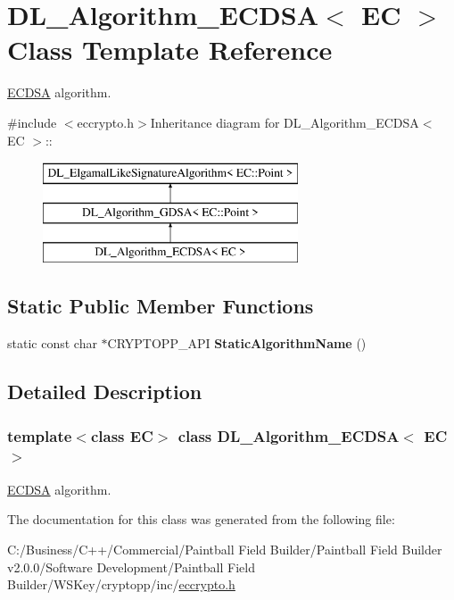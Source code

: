 \hypertarget{class_d_l___algorithm___e_c_d_s_a}{
\section{DL\_\-Algorithm\_\-ECDSA$<$ EC $>$ Class Template Reference}
\label{class_d_l___algorithm___e_c_d_s_a}
}


\hyperlink{struct_e_c_d_s_a}{ECDSA} algorithm.  


{\ttfamily \#include $<$eccrypto.h$>$}Inheritance diagram for DL\_\-Algorithm\_\-ECDSA$<$ EC $>$::\begin{figure}[H]
\begin{center}
\leavevmode
\includegraphics[height=3cm]{class_d_l___algorithm___e_c_d_s_a}
\end{center}
\end{figure}
\subsection*{Static Public Member Functions}
\begin{DoxyCompactItemize}
\item 
\hypertarget{class_d_l___algorithm___e_c_d_s_a_a678537b746327ca5469cafa978c96eb6}{
static const char $\ast$CRYPTOPP\_\-API {\bfseries StaticAlgorithmName} ()}
\label{class_d_l___algorithm___e_c_d_s_a_a678537b746327ca5469cafa978c96eb6}

\end{DoxyCompactItemize}


\subsection{Detailed Description}
\subsubsection*{template$<$class EC$>$ class DL\_\-Algorithm\_\-ECDSA$<$ EC $>$}

\hyperlink{struct_e_c_d_s_a}{ECDSA} algorithm. 

The documentation for this class was generated from the following file:\begin{DoxyCompactItemize}
\item 
C:/Business/C++/Commercial/Paintball Field Builder/Paintball Field Builder v2.0.0/Software Development/Paintball Field Builder/WSKey/cryptopp/inc/\hyperlink{eccrypto_8h}{eccrypto.h}\end{DoxyCompactItemize}
